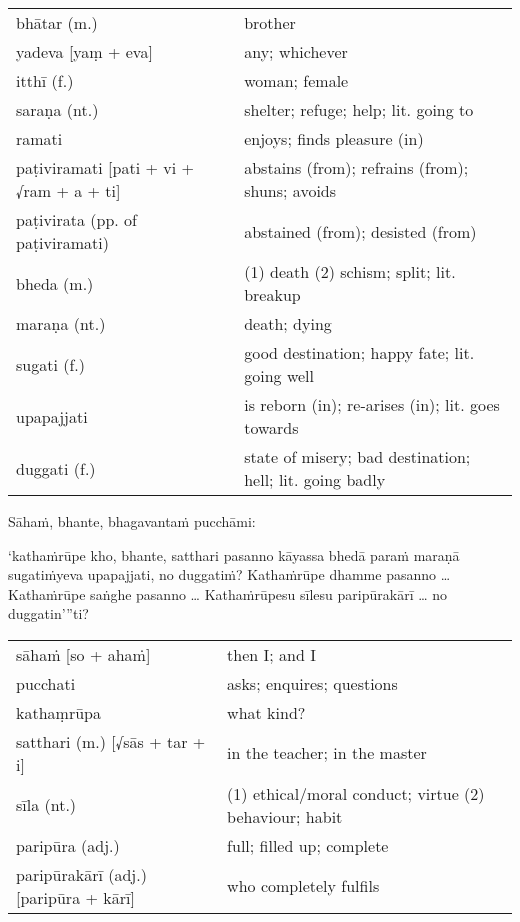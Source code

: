 \documentclass[11pt,oneside]{memoir}
\begin{document}
\begin{longtable}{L{\colOne} L{\colTwo}}
bhātar (m.) & brother\\[0pt]
yadeva [yaṃ + eva] & any; whichever\\[0pt]
itthī (f.) & woman; female\\[0pt]
saraṇa (nt.) & shelter; refuge; help; lit. going to\\[0pt]
ramati & enjoys; finds pleasure (in)\\[0pt]
paṭiviramati [pati + vi + √ram + a + ti] & abstains (from); refrains (from); shuns; avoids\\[0pt]
paṭivirata (pp. of paṭiviramati) & abstained (from); desisted (from)\\[0pt]
bheda (m.) & (1) death (2) schism; split; lit. breakup\\[0pt]
maraṇa (nt.) & death; dying\\[0pt]
sugati (f.) & good destination; happy fate; lit. going well\\[0pt]
upapajjati & is reborn (in); re-arises (in); lit. goes towards\\[0pt]
duggati (f.) & state of misery; bad destination; hell; lit. going badly\\[0pt]
\end{longtable}

\clearpage

\begin{spacedquote}
Sāhaṁ, bhante, bhagavantaṁ pucchāmi:

‘kathaṁrūpe kho, bhante, satthari pasanno
kāyassa bhedā paraṁ maraṇā sugatiṁyeva upapajjati, no duggatiṁ?
Kathaṁrūpe dhamme pasanno \ldots{}
Kathaṁrūpe saṅghe pasanno \ldots{}
Kathaṁrūpesu sīlesu paripūrakārī \ldots{} no duggatin’”ti?
\end{spacedquote}

\begin{longtable}{L{\colOne} L{\colTwo}}
sāhaṁ [so + ahaṁ] & then I; and I\\[0pt]
pucchati & asks; enquires; questions\\[0pt]
kathaṃrūpa & what kind?\\[0pt]
satthari (m.) [√sās + tar + i] & in the teacher; in the master\\[0pt]
sīla (nt.) & (1) ethical/moral conduct; virtue (2) behaviour; habit\\[0pt]
paripūra (adj.) & full; filled up; complete\\[0pt]
paripūrakārī (adj.) [paripūra + kārī] & who completely fulfils\\[0pt]
\end{longtable}
\end{document}
